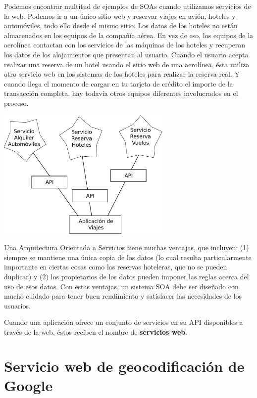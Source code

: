 Podemos encontrar multitud de ejemplos de SOAs cuando utilizamos servicios de la web. Podemos ir a un
único sitio web y reservar viajes en avión, hoteles y automóviles, todo ello desde el
mismo sitio. Los datos de los hoteles no están almacenados en los equipos de la
compañía aérea. En vez de eso, los equipos de la aerolínea contactan con los servicios
de las máquinas de los hoteles y recuperan los datos de los alojamientos que presentan al
usuario. Cuando el usuario acepta realizar una reserva de un hotel usando el sitio web
de una aerolínea, ésta utiliza otro servicio web en los sistemas de los hoteles para realizar
la reserva real. Y cuando llega el momento de cargar en tu tarjeta de crédito el importe de la
transacción completa, hay todavía otros equipos diferentes involucrados en el proceso.

\beforefig
\centerline{\includegraphics[height=2.50in]{figs2/soa.eps}}
\afterfig

Una Arquitectura Orientada a Servicios tiene muchas ventajas, que incluyen: (1)
siempre se mantiene una única copia de los datos (lo cual resulta particularmente
importante en ciertas cosas como las reservas hoteleras, que no se pueden duplicar)
y (2) los propietarios de los datos pueden imponer las reglas acerca del uso de esos datos.
Con estas ventajas, un sistema SOA debe ser diseñado con mucho cuidado para
tener buen rendimiento y satisfacer las necesidades de los usuarios.

Cuando una aplicación ofrece un conjunto de servicios en su API disponibles a través de la
web, éstos reciben el nombre de {\bf servicios web}.

\section{Servicio web de geocodificación de Google}


